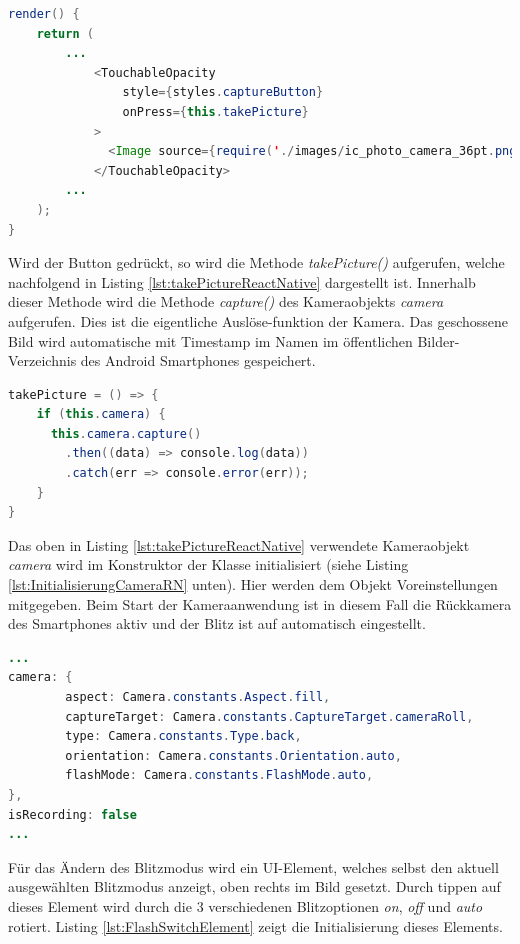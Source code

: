 \begin{lstlisting}[caption=Deklaration eines \textit{TouchableOpacity}-UI-Objekts für die Darstellung des Auslösebuttons der Kamera, label=lst:CaptureButton, language=Java]
render() {
    return (
		...
			<TouchableOpacity
                style={styles.captureButton}
                onPress={this.takePicture}
            >
              <Image source={require('./images/ic_photo_camera_36pt.png')}/>
            </TouchableOpacity>
		...
	);
}
\end{lstlisting} 

Wird der Button gedrückt, so wird die Methode \textit{takePicture()} aufgerufen, welche nachfolgend in Listing \ref{lst:takePictureReactNative} dargestellt ist. Innerhalb dieser Methode wird die Methode \textit{capture()} des Kameraobjekts \textit{camera} aufgerufen. Dies ist die eigentliche Auslöse-funktion der Kamera. Das geschossene Bild wird automatische mit Timestamp im Namen im öffentlichen Bilder-Verzeichnis des Android Smartphones gespeichert. 

\begin{lstlisting}[caption=Die Methode \textit{takePicture()} zum Auslösen der Kamera, label=lst:takePictureReactNative, language=Java]
takePicture = () => {
    if (this.camera) {
      this.camera.capture()
        .then((data) => console.log(data))
        .catch(err => console.error(err));
    }
}
\end{lstlisting} 

Das oben in Listing \ref{lst:takePictureReactNative} verwendete Kameraobjekt \textit{camera} wird im Konstruktor der Klasse initialisiert (siehe Listing \ref{lst:InitialisierungCameraRN} unten). Hier werden dem Objekt Voreinstellungen mitgegeben. Beim Start der Kameraanwendung ist in diesem Fall die Rückkamera des Smartphones aktiv und der Blitz ist auf automatisch eingestellt. 
\clearpage

\begin{lstlisting}[caption=Initialisierung des Kameraobjekts im Konstruktor, label=lst:InitialisierungCameraRN, language=Java]
...
camera: {
        aspect: Camera.constants.Aspect.fill,
        captureTarget: Camera.constants.CaptureTarget.cameraRoll,
        type: Camera.constants.Type.back,
        orientation: Camera.constants.Orientation.auto,
        flashMode: Camera.constants.FlashMode.auto,
},
isRecording: false
...
\end{lstlisting}

Für das Ändern des Blitzmodus wird ein UI-Element, welches selbst den aktuell ausgewählten Blitzmodus anzeigt, oben rechts im Bild gesetzt. Durch tippen auf dieses Element wird durch die 3 verschiedenen Blitzoptionen \textit{on}, \textit{off} und \textit{auto} rotiert. Listing \ref{lst:FlashSwitchElement} zeigt die Initialisierung dieses Elements.  

